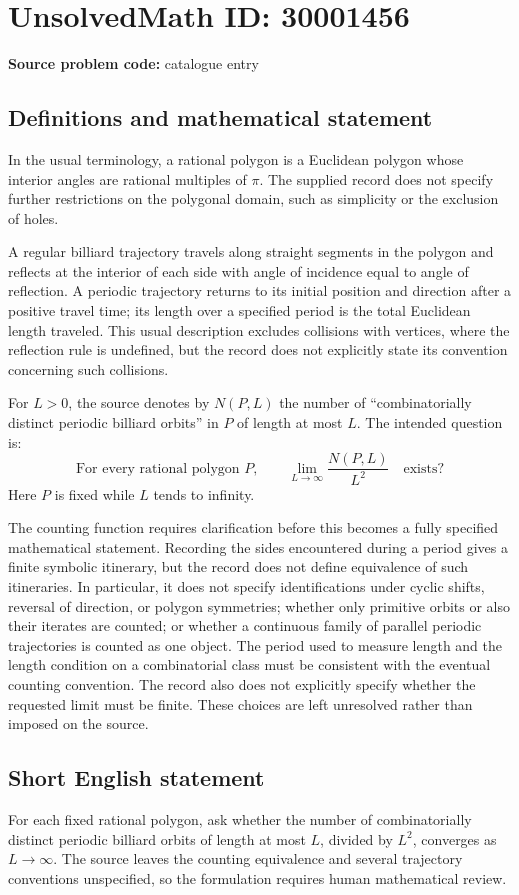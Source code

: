 \documentclass[11pt]{article}
\begin{document}
\section*{UnsolvedMath ID: 30001456}
\textbf{Source problem code:} catalogue entry
\subsection{Definitions and mathematical statement}
In the usual terminology, a rational polygon is a Euclidean polygon whose interior angles are rational multiples of \(\pi\). The supplied record does not specify further restrictions on the polygonal domain, such as simplicity or the exclusion of holes.

A regular billiard trajectory travels along straight segments in the polygon and reflects at the interior of each side with angle of incidence equal to angle of reflection. A periodic trajectory returns to its initial position and direction after a positive travel time; its length over a specified period is the total Euclidean length traveled. This usual description excludes collisions with vertices, where the reflection rule is undefined, but the record does not explicitly state its convention concerning such collisions.

For \(L>0\), the source denotes by \(N(P,L)\) the number of ``combinatorially distinct periodic billiard orbits'' in \(P\) of length at most \(L\). The intended question is:
\[
\text{For every rational polygon }P,\qquad
\lim_{L\to\infty}\frac{N(P,L)}{L^2}
\quad\text{exists?}
\]
Here \(P\) is fixed while \(L\) tends to infinity.

The counting function requires clarification before this becomes a fully specified mathematical statement. Recording the sides encountered during a period gives a finite symbolic itinerary, but the record does not define equivalence of such itineraries. In particular, it does not specify identifications under cyclic shifts, reversal of direction, or polygon symmetries; whether only primitive orbits or also their iterates are counted; or whether a continuous family of parallel periodic trajectories is counted as one object. The period used to measure length and the length condition on a combinatorial class must be consistent with the eventual counting convention. The record also does not explicitly specify whether the requested limit must be finite. These choices are left unresolved rather than imposed on the source.
\subsection{Short English statement}
For each fixed rational polygon, ask whether the number of combinatorially distinct periodic billiard orbits of length at most \(L\), divided by \(L^2\), converges as \(L\to\infty\). The source leaves the counting equivalence and several trajectory conventions unspecified, so the formulation requires human mathematical review.
\end{document}
